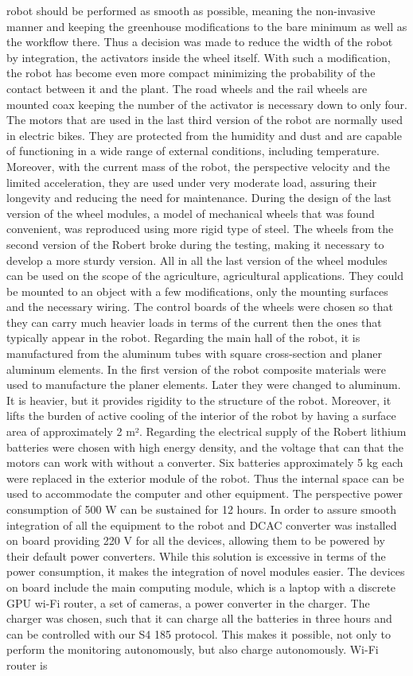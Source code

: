 \begin{description}
robot should be performed as smooth as possible, meaning the non-invasive manner and keeping the greenhouse modifications to the bare minimum as well as the workflow there. Thus a decision was made to reduce the width of the robot by integration, the activators inside the wheel itself. With such a modification, the robot has become even more compact minimizing the probability of the contact between it and the plant. The road wheels and the rail wheels are mounted coax keeping the number of the activator is necessary down to only four. The motors that are used in the last third version of the robot are normally used in electric bikes. They are protected from the humidity and dust and are capable of functioning in a wide range of external conditions, including temperature. Moreover, with the current mass of the robot, the perspective velocity and the limited acceleration, they are used under very moderate load, assuring their longevity and reducing the need for maintenance. During the design of the last version of the wheel modules, a model of mechanical wheels that was found convenient, was reproduced using more rigid type of steel. The wheels from the second version of the Robert broke during the testing, making it necessary to develop a more sturdy version. All in all the last version of the wheel modules can be used on the scope of the agriculture, agricultural applications. They could be mounted to an object with a few modifications, only the mounting surfaces and the necessary wiring. The control boards of the wheels were chosen so that they can carry much heavier loads in terms of the current then the ones that typically appear in the robot. Regarding the main hall of the robot, it is manufactured from the aluminum tubes with square cross-section and planer aluminum elements. In the first version of the robot composite materials were used to manufacture the planer elements. Later they were changed to aluminum. It is heavier, but it provides rigidity to the structure of the robot. Moreover, it lifts the burden of active cooling of the interior of the robot by having a surface area of approximately 2 m². Regarding the electrical supply of the Robert lithium batteries were chosen with high energy density, and the voltage that can that the motors can work with without a converter. Six batteries approximately 5 kg each were replaced in the exterior module of the robot. Thus the internal space can be used to accommodate the computer and other equipment. The perspective power consumption of 500 W can be sustained for 12 hours. In order to assure smooth integration of all the equipment to the robot and DCAC converter was installed on board providing 220 V for all the devices, allowing them to be powered by their default power converters. While this solution is excessive in terms of the power consumption, it makes the integration of novel modules easier. The devices on board include the main computing module, which is a laptop with a discrete GPU wi-Fi router, a set of cameras, a power converter in the charger. The charger was chosen, such that it can charge all the batteries in three hours and can be controlled with our S4 185 protocol. This makes it possible, not only to perform the monitoring autonomously, but also charge autonomously. Wi-Fi router is 
\end{description}
